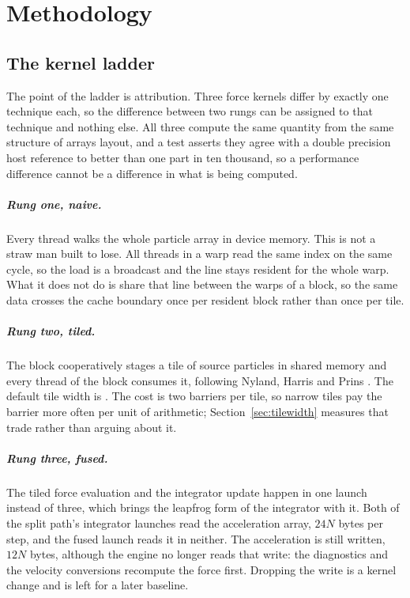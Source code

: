 \chapter{Methodology}
\label{ch:methodology}

\section{The kernel ladder}

The point of the ladder is attribution. Three force kernels differ by exactly
one technique each, so the difference between two rungs can be assigned to that
technique and nothing else. All three compute the same quantity from the same
structure of arrays layout, and a test asserts they agree with a double
precision host reference to better than one part in ten thousand, so a
performance difference cannot be a difference in what is being computed.

\paragraph{Rung one, naive.} Every thread walks the whole particle array in
device memory. This is not a straw man built to lose. All threads in a warp read
the same index on the same cycle, so the load is a broadcast and the line stays
resident for the whole warp. What it does not do is share that line between the
warps of a block, so the same data crosses the cache boundary once per resident
block rather than once per tile.

\paragraph{Rung two, tiled.} The block cooperatively stages a tile of source
particles in shared memory and every thread of the block consumes it, following
Nyland, Harris and Prins \cite{nyland2007}. The default tile width is
\BestTileWidth{}. The cost is two barriers per tile, so narrow tiles pay the barrier
more often per unit of arithmetic; Section~\ref{sec:tilewidth} measures that
trade rather than arguing about it.

\paragraph{Rung three, fused.} The tiled force evaluation and the integrator
update happen in one launch instead of three, which brings the leapfrog form of
the integrator with it. Both of the split path's integrator launches read the
acceleration array, $24N$ bytes per step, and the fused launch reads it in neither.
The acceleration is still written, $12N$ bytes, although the engine no longer reads
that write: the diagnostics and the velocity conversions recompute the force first.
Dropping the write is a kernel change and is left for a later baseline.

